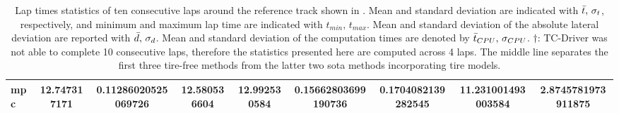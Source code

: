 \documentclass[letterpaper, conference]{IEEEtran}
\begin{document}
\begin{table}[hb]
{\begin{tabular}{lcccccccc}
        \gls{mpc}& \num{ 12.747317171 } & \num{ 0.11286020525069726 } & \num{ 12.580536604 } & \num{ 12.992530584 } & \num{ 0.15662803699190736 } & \textbf{\num[text-series-to-math]{ 0.1704082139282545 }} & \num{ 11.231001493003584 } & \num{ 2.8745781973911875 } \\
         \bottomrule
    \end{tabular}
    }
    \caption{Lap times statistics of ten consecutive laps around the reference track shown in . Mean and standard deviation are indicated with $\Bar{t},\,\sigma_t$, respectively, and minimum and maximum lap time are indicated with $t_{min},\,t_{max}$. Mean and standard deviation of the absolute lateral deviation are reported with $\Bar{d},\,\sigma_d$. Mean and standard deviation of the computation times are denoted by $\Bar{t}_{CPU},\,\sigma_{CPU}$. $\dagger$: TC-Driver was not able to complete 10 consecutive laps, therefore the statistics presented here are computed across 4 laps. The middle line separates the first three tire-free methods from the latter two \gls{sota} methods incorporating tire models.}
    \label{tab:laptimes}
\end{table}
\end{document}
